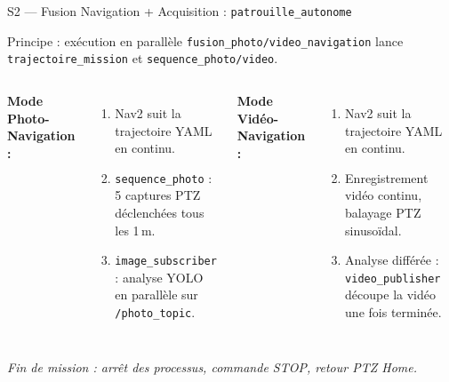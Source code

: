 \documentclass[aspectratio=169]{beamer}
\begin{document}
\begin{frame}{S2 — Fusion Navigation + Acquisition : \texttt{patrouille\_autonome}}
    \begin{block}{Principe : exécution en parallèle}
        \texttt{fusion\_photo/video\_navigation} lance \texttt{trajectoire\_mission} et \texttt{sequence\_photo/video}.
    \end{block}
    \vspace{0.25cm}
    \begin{columns}[t]
        \textbf{Mode Photo-Navigation :}
        \begin{enumerate}
            \item Nav2 suit la trajectoire YAML en continu.
            \item \texttt{sequence\_photo} : 5 captures PTZ déclenchées tous les 1\,m.
            \item \texttt{image\_subscriber} : analyse YOLO en parallèle sur \texttt{/photo\_topic}.
        \end{enumerate}
        \textbf{Mode Vidéo-Navigation :}
        \begin{enumerate}
            \item Nav2 suit la trajectoire YAML en continu.
            \item Enregistrement vidéo continu, balayage PTZ sinusoïdal.
            \item Analyse différée : \texttt{video\_publisher} découpe la vidéo une fois terminée.
        \end{enumerate}
    \end{columns}
    \vspace{0.5cm}
    \centering
    \textit{Fin de mission : arrêt des processus, commande STOP, retour PTZ Home.}
\end{frame}
\end{document}
